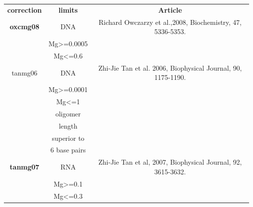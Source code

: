 \documentclass{article}
\begin{document}
\begin{itemize}
 \begin{table}[h]
\begin{tabular}[h]{| c | c | c |}
\textbf{correction} & \textbf{limits} & \textbf{Article} \\ 
\textbf{oxcmg08} & DNA & Richard Owczarzy et al.,2008, Biochemistry, 47, 5336-5353. \\
 & Mg>=0.0005 & \\
 & Mg<=0.6 & \\
tanmg06 & DNA & Zhi-Jie Tan et al. 2006, Biophysical Journal, 90, 1175-1190. \\
 & Mg>=0.0001 & \\
 & Mg<=1 & \\
 & oligomer & \\
 & length & \\
 & superior to & \\
 & 6 base pairs & \\
\textbf{tanmg07} & RNA & Zhi-Jie Tan et al, 2007, Biophysical Journal, 92, 3615-3632. \\
 & Mg>=0.1 & \\
 & Mg<=0.3 & \\
\end{tabular}
\end{table}


\end{itemize}
\end{document}
